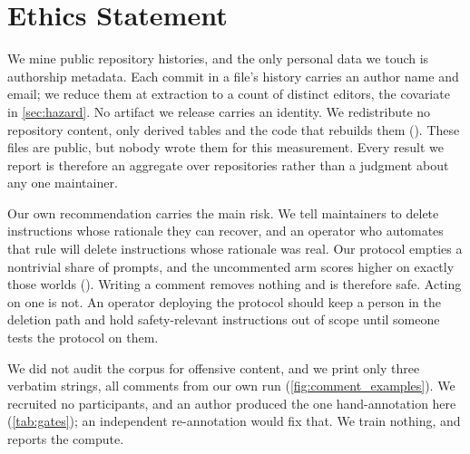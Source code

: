 \section*{Ethics Statement}

We mine public repository histories, and the only personal data we touch is
authorship metadata. Each commit in a file's history carries an author name and
email; we reduce them at extraction to a count of distinct editors, the
covariate in \autoref{sec:hazard}. No artifact we release carries an identity.
We redistribute no repository content, only derived tables and the code that
rebuilds them (). These files are public, but
nobody wrote them for this measurement. Every result we report is therefore an
aggregate over \FieldRepos{} repositories rather than a judgment about any one
maintainer.

Our own recommendation carries the main risk. We tell maintainers to delete
instructions whose rationale they can recover, and an operator who automates
that rule will delete instructions whose rationale was real. Our protocol
empties a nontrivial share of prompts, and the uncommented arm scores higher on
exactly those worlds (). Writing a comment
removes nothing and is therefore safe. Acting on one is not. An operator
deploying the protocol should keep a person in the deletion path and hold
safety-relevant instructions out of scope until someone tests the protocol on
them.

We did not audit the corpus for offensive content, and we print only three
verbatim strings, all comments from our own run
(\autoref{fig:comment_examples}). We recruited no participants, and an author
produced the one hand-annotation here (\autoref{tab:gates}); an independent
re-annotation would fix that. We train nothing, and  reports
the compute.
